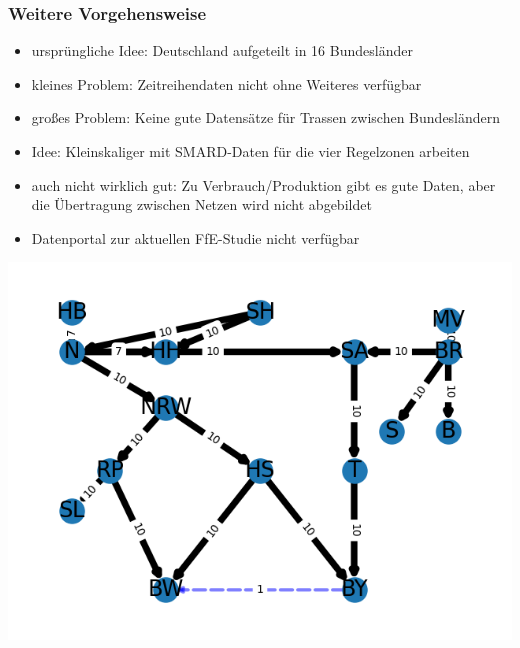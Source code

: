 \documentclass[aspectratio=169,t]{beamer}
\begin{document}
	\begin{frame}
		\frametitle{Weitere Vorgehensweise}
		\vspace*{0mm}
			\begin{minipage}{1\linewidth}
			\begin{minipage}{.5\linewidth}
				\begin{itemize}
					\item ursprüngliche Idee: Deutschland aufgeteilt in 16 Bundesländer
					\item kleines Problem: Zeitreihendaten nicht ohne Weiteres verfügbar
					\item großes Problem: Keine gute Datensätze für Trassen zwischen Bundesländern
					\item Idee: Kleinskaliger mit SMARD-Daten für die vier Regelzonen arbeiten
					\item auch nicht wirklich gut: Zu Verbrauch/Produktion gibt es gute Daten, aber die Übertragung zwischen Netzen wird nicht abgebildet
					\item Datenportal zur aktuellen FfE-Studie nicht verfügbar
				\end{itemize}
			\end{minipage}
			\hfill
			\begin{minipage}{.5\linewidth}
				\centering
				\includegraphics[width=.8\linewidth]{Example_graph_2.png}
				
			\end{minipage}
		\end{minipage}	
	
			
	\end{frame}
	
\end{document}
